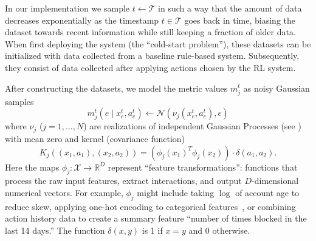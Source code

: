 In our implementation we sample $t \gets \mathcal{T}$ in such a way that the amount of data decreases exponentially as the timestamp $t \in \mathcal{T}$ goes back in time, biasing the dataset towards recent information while still keeping a fraction of older data. When first deploying the system (the ``cold-start problem''), these datasets can be initialized with data collected from a baseline rule-based system. Subsequently, they consist of data collected after applying actions chosen by the RL system.

After constructing the datasets, we model the metric values $m^t_{j}$ as noisy Gaussian samples
\[
m^t_{j}(e \mid x_e^t, a_e^t) \gets \mathcal{N}( \nu_j(x_e^t,a_e^t), \epsilon) 
\]
where $\nu_j$ ($j  = 1, \ldots, N$) are realizations of independent Gaussian Processes (see \cite{williams2006gaussian}) with mean zero and kernel (covariance function)
\begin{equation}\label{eq:kernel}
K_j((x_1,a_1),(x_2,a_2)) = (\phi_j(x_1)^T \phi_j(x_2))\cdot \delta(a_1,a_2).
\end{equation}
Here the maps $\phi_j: \mathcal{X}\rightarrow \mathbb{R}^D$ represent ``feature transformations'': functions that process the raw input features, extract interactions, and output $D$-dimensional numerical vectors. For example, $\phi_j$ might include taking $\log$ of account age to reduce skew, applying one-hot encoding to categorical features~\cite{one-hot}, or combining action history data to create a summary feature ``number of times blocked in the last 14 days.'' The function $\delta(x,y)$ is 1 if $x = y$ and 0 otherwise.

